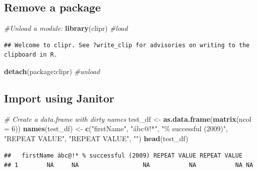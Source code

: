\documentclass[
]{article}
\newenvironment{Shaded}{\begin{snugshade}}{\end{snugshade}}
\newcommand{\AttributeTok}[1]{\textcolor[rgb]{0.13,0.29,0.53}{#1}}
\newcommand{\CommentTok}[1]{\textcolor[rgb]{0.56,0.35,0.01}{\textit{#1}}}
\newcommand{\DecValTok}[1]{\textcolor[rgb]{0.00,0.00,0.81}{#1}}
\newcommand{\FunctionTok}[1]{\textcolor[rgb]{0.13,0.29,0.53}{\textbf{#1}}}
\newcommand{\NormalTok}[1]{#1}
\newcommand{\OtherTok}[1]{\textcolor[rgb]{0.56,0.35,0.01}{#1}}
\newcommand{\SpecialCharTok}[1]{\textcolor[rgb]{0.81,0.36,0.00}{\textbf{#1}}}
\newcommand{\StringTok}[1]{\textcolor[rgb]{0.31,0.60,0.02}{#1}}
\begin{document}
\hypertarget{remove-a-package}{%
\subsection{Remove a package}\label{remove-a-package}}

\begin{Shaded}
\begin{Highlighting}[]
\CommentTok{\#Unload a module: }
\FunctionTok{library}\NormalTok{(clipr) }\CommentTok{\#load}
\end{Highlighting}
\end{Shaded}

\begin{verbatim}
## Welcome to clipr. See ?write_clip for advisories on writing to the clipboard in R.
\end{verbatim}

\begin{Shaded}
\begin{Highlighting}[]
\FunctionTok{detach}\NormalTok{(package}\SpecialCharTok{:}\NormalTok{clipr) }\CommentTok{\#unload}
\end{Highlighting}
\end{Shaded}

\hypertarget{import-using-janitor}{%
\subsection{Import using Janitor}\label{import-using-janitor}}

\begin{Shaded}
\begin{Highlighting}[]
\CommentTok{\# Create a data.frame with dirty names}
\NormalTok{test\_df }\OtherTok{\textless{}{-}} \FunctionTok{as.data.frame}\NormalTok{(}\FunctionTok{matrix}\NormalTok{(}\AttributeTok{ncol =} \DecValTok{6}\NormalTok{))}
\FunctionTok{names}\NormalTok{(test\_df) }\OtherTok{\textless{}{-}} \FunctionTok{c}\NormalTok{(}\StringTok{"firstName"}\NormalTok{, }\StringTok{"ábc@!*"}\NormalTok{, }\StringTok{"\% successful (2009)"}\NormalTok{,}
                    \StringTok{"REPEAT VALUE"}\NormalTok{, }\StringTok{"REPEAT VALUE"}\NormalTok{, }\StringTok{""}\NormalTok{)}
\FunctionTok{head}\NormalTok{(test\_df)}
\end{Highlighting}
\end{Shaded}

\begin{verbatim}
##   firstName ábc@!* % successful (2009) REPEAT VALUE REPEAT VALUE   
## 1        NA     NA                  NA           NA           NA NA
\end{verbatim}
\end{document}
